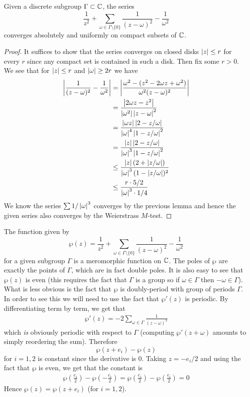 \begin{proposition}
Given a discrete subgroup $\Gamma \subset \mathbb{C}$, the series
$$\frac{1}{z^2} + \sum_{\omega \in \Gamma \setminus \{0\}} \frac{1}{(z - \omega)^2} - \frac{1}{\omega^2}$$
converges absolutely and uniformly on compact subsets of $\mathbb{C}$.
\end{proposition}
\begin{proof}
    It suffices to show that the series converges on closed disks $\left|z\right| \leq r$ for every $r$ since any compact set is contained in such a disk. Then fix some $r > 0$. We see that for $\left|z\right| \leq r$ and $\left|\omega\right| \geq 2r$ we have 
    \begin{align*}
        \left|\frac{1}{(z - \omega)^2} - \frac{1}{\omega^2}\right| &= \left|\frac{\omega^2 - (z^2 - 2\omega z + \omega^2)}{\omega^2(z - \omega)^2}\right|\\
        &= \frac{\left|2\omega z - z^2\right|}{\left|\omega^2\right| \left|z - \omega\right|^2}\\
        &= \frac{\left|\omega z\right| \left|2 - z/\omega\right|}{\left|\omega\right|^4 \left|1 - z/\omega\right|^2}\\
        &= \frac{\left|z\right| \left|2 - z/\omega\right|}{\left|\omega\right|^3 \left|1 - z/\omega\right|^2}\\
        &\leq \frac{\left|z\right|(2 + \left|z/\omega\right|)}{\left|\omega\right|^3(1 - \left|z/\omega\right|)^2}\\
        &\leq \frac{r \cdot 5/2}{\left|\omega\right|^3 \cdot 1/4}
    \end{align*}
    We know the series $\sum 1/\left|\omega\right|^3$ converges by the previous lemma and hence the given series also converges by the Weierstrass $M$-test.
\end{proof}

The function given by 
$$\wp(z) = \frac{1}{z^2} + \sum_{\omega \in \Gamma \setminus \{0\}} \frac{1}{(z - \omega)^2} - \frac{1}{\omega^2}$$
for a given subgroup $\Gamma$ is a meromorphic function on $\mathbb{C}$. The poles of $\wp$ are exactly the points of $\Gamma$, which are in fact double poles. It is also easy to see that $\wp(z)$ is even (this requires the fact that $\Gamma$ is a group so if $\omega \in \Gamma$ then $-\omega \in \Gamma$). What is less obvious is the fact that $\wp$ is doubly-period with group of periods $\Gamma$. In order to see this we will need to use the fact that $\wp'(z)$ is periodic. By differentiating term by term, we get that 
\begin{align*}
    \wp'(z) = -2 \sum_{\omega \in \Gamma} \frac{1}{(z - \omega)^3}
\end{align*}
which \textit{is} obviously periodic with respect to $\Gamma$ (computing $\wp'(z + \omega)$ amounts to simply reordering the sum). Therefore
$$\wp(z + e_i) - \wp(z)$$
for $i = 1, 2$ is constant since the derivative is 0. Taking $z = -e_i/2$ and using the fact that $\wp$ is even, we get that the constant is
\begin{align*}
    \wp \left( \frac{e_i}{2} \right) - \wp \left( -\frac{e_i}{2} \right) = \wp \left( \frac{e_i}{2} \right) - \wp \left( \frac{e_i}{2} \right) = 0
\end{align*}
Hence $\wp(z) = \wp(z + e_i)$ (for $i = 1, 2$).

